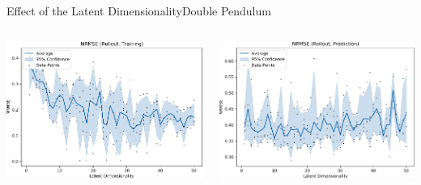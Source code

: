 \documentclass[
	aspectratio=43,
	color={accentcolor=1c},
	logo=false,
	colorframetitle=true,
]{tudabeamer}
\begin{document}
			\begin{frame}{Effect of the Latent Dimensionality}{Double Pendulum}
				\vspace{-0.6cm}
				\begin{columns}[c]
					\begin{column}{0.5\linewidth}
						\begin{center}
							\includegraphics[width=\linewidth]{figures/experiments/acrobot-gym/latent-dim/comparison-rmse-rollout-train-normalized-mean-vs-latent-dim.pdf}
						\end{center}
					\end{column}
					\begin{column}{0.5\linewidth}
						\begin{center}
							\includegraphics[width=\linewidth]{figures/experiments/acrobot-gym/latent-dim/comparison-rmse-rollout-prediction-normalized-mean-vs-latent-dim.pdf}
						\end{center}
					\end{column}
				\end{columns}


\end{frame}
\end{document}
